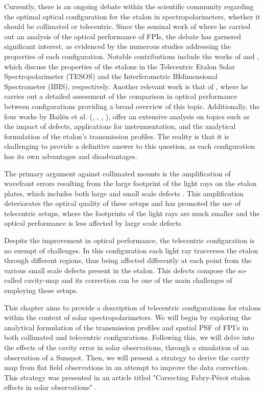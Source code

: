 Currently, there is an ongoing debate within the scientific community regarding the optimal optical configuration for the etalon in spectropolarimeters, whether it should be collimated or telecentric. Since the seminal work of \cite{beckers} where he carried out an analysis of the optical performance of FPIs, the debate has garnered significant interest, as evidenced by the numerous studies addressing the properties of each configuration. Notable contributions include the works of \cite{kentischer1998tesos} and \cite{cavallini2006ibis}, which discuss the properties of the etalons in the Telecentric Etalon Solar Spectropolarimeter (TESOS) and the Interferometric BIdimensional Spectrometer (IBIS), respectively. Another relevant work is that of \cite{ghosts-etalon}, where he carries out a detailed assessment of the comparison in optical performance between configurations providing a broad overview of this topic. Additionally, the four works by Bailén et al. (\citealt{franI}, \citealt{franII}, \citealt{franIII}, \citealt{franIV}), offer an extensive analysis on topics such as the impact of defects, applications for instrumentation, and the analytical formulation of the etalon's transmission profiles. The reality is that it is challenging to provide a definitive answer to this question, as each configuration has its own advantages and disadvantages.

The primary argument against collimated mounts is the amplification of wavefront errors resulting from the large footprint of the light rays on the etalon plates, which includes both large and small scale defects \citep{fran_review}. This amplification deteriorates the optical quality of these setups and has promoted the use of telecentric setups, where the footprints of the light rays are much smaller and the optical performance is less affected by large scale defects.

Despite the improvement in optical performance, the telecentric configuration is no exempt of challenges. In this configuration each light ray trasverses the etalon through different regions, thus being affected differently at each point from the various small scale defects present in the etalon. This defects compose the so-called cavity-map and its correction can be one of the main challenges of employing these setups.

This chapter aims to provide a description of telecentric configurations for etalons within the context of solar spectropolarimeters. We will begin by exploring the analytical formulation of the transmission profiles and spatial PSF of FPI's in both collimated and telecentric configurations. Following this, we will delve into the effects of the cavity error in solar observations, through a simulation of an observation of a Sunspot. Then, we will present a strategy to derive the cavity map from flat field observations in an attempt to improve the data correction. This strategy was presented in an article titled "Correcting Fabry-P{\'e}rot etalon effects in solar observations"  \citep{FP-correccion}.

